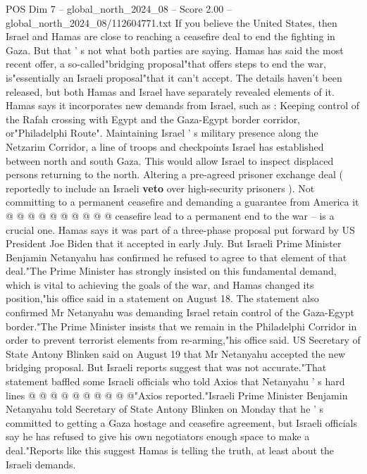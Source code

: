 \begin{textsample}{POS Dim 7 – global\_north\_2024\_08 – Score 2.00 – global\_north\_2024\_08/112604771.txt}  \label{ex:f7_pos_360}
If you believe the United States, then Israel and Hamas are close to reaching a ceasefire deal to end the fighting in Gaza.
But that ' s not what both parties are saying.
Hamas has said the most recent offer, a so-called"bridging proposal"that offers steps to end the war, is"essentially an Israeli proposal"that it can't accept.
The details haven't been released, but both Hamas and Israel have separately revealed elements of it.
Hamas says it incorporates new demands from Israel, such as : Keeping control of the Rafah crossing with Egypt and the Gaza-Egypt border corridor, or"Philadelphi Route".
Maintaining Israel ' s military presence along the Netzarim Corridor, a line of troops and checkpoints Israel has established between north and south Gaza.
This would allow Israel to inspect displaced persons returning to the north.
Altering a pre-agreed prisoner exchange deal ( reportedly to include an Israeli \textbf{veto} over high-security prisoners ).
Not committing to a permanent ceasefire and demanding a guarantee from America it @ @ @ @ @ @ @ @ @ @ ceasefire lead to a permanent end to the war -- is a crucial one.
Hamas says it was part of a three-phase proposal put forward by US President Joe Biden that it accepted in early July.
But Israeli Prime Minister Benjamin Netanyahu has confirmed he refused to agree to that element of that deal."The Prime Minister has strongly insisted on this fundamental demand, which is vital to achieving the goals of the war, and Hamas changed its position,"his office said in a statement on August 18.
The statement also confirmed Mr Netanyahu was demanding Israel retain control of the Gaza-Egypt border."The Prime Minister insists that we remain in the Philadelphi Corridor in order to prevent terrorist elements from re-arming,"his office said.
US Secretary of State Antony Blinken said on August 19 that Mr Netanyahu accepted the new bridging proposal.
But Israeli reports suggest that was not accurate."That statement baffled some Israeli officials who told Axios that Netanyahu ' s hard lines @ @ @ @ @ @ @ @ @ @"Axios reported."Israeli Prime Minister Benjamin Netanyahu told Secretary of State Antony Blinken on Monday that he ' s committed to getting a Gaza hostage and ceasefire agreement, but Israeli officials say he has refused to give his own negotiators enough space to make a deal."Reports like this suggest Hamas is telling the truth, at least about the Israeli demands.

\end{textsample}
